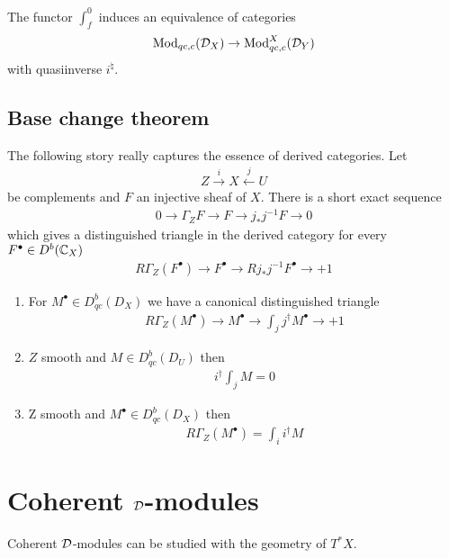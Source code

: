 \begin{theorem}
	 The functor $\int_f^0$ induces an equivalence of categories \begin{align*}
		\operatorname{Mod}_{qc,c}({\mathcal{D}}_X) \to \operatorname{Mod}^X_{qc,c}({\mathcal{D}}_Y)
	\end{align*}
	with quasiinverse $i^\natural$.
\end{theorem}

\subsection{Base change theorem}
The following story really captures the essence of derived categories. Let \begin{align*}
	Z \xrightarrow{i} X \xleftarrow{j} U
\end{align*} be complements and $F$ an injective sheaf of $X$. There is a short exact sequence \begin{align*}
	0 \to \Gamma_Z F \to F \to j_*j^{-1}F \to 0
\end{align*} which gives a distinguished triangle in the derived category for every $F^\bullet \in D^b(\mathbb{C}_X)$
\begin{align*}
	R\Gamma_Z(F^\bullet) \to F^\bullet \to Rj_*j^{-1}F^\bullet \to +1
\end{align*}
\begin{proposition}
	\hfill
	\begin{enumerate}
		\item For $M^\bullet \in D^b_{qc}(D_X)$ we have a canonical distinguished triangle \begin{align*}
			      R\Gamma_Z(M^\bullet) \to M^\bullet \to \int_j j^\dagger M^\bullet \to +1
		      \end{align*}
		\item $Z$ smooth and $M\in D^b_{qc}(D_U)$ then \begin{align*}
			      i^\dagger\int_j M = 0
		      \end{align*}
		\item Z smooth and $M^\bullet\in D^b_{qc}(D_X)$ then \begin{align*}
			      R\Gamma_Z(M^\bullet) = \int_i i^\dagger M
		      \end{align*}
	\end{enumerate}
\end{proposition}
\section{Coherent ${\mathcal{D}}$-modules}
Coherent ${\mathcal{D}}$-modules can be studied with the geometry of $T^*X$.
